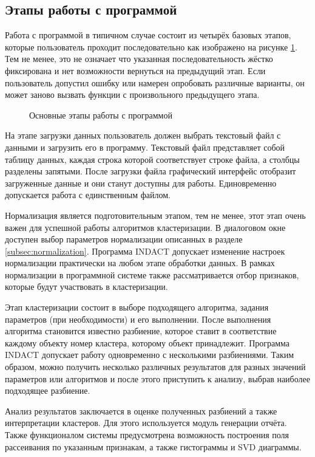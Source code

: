 \documentclass[12pt]{diploma}
\begin{document}
	\subsection{Этапы работы с программой}
	
	Работа с программой в типичном случае состоит из четырёх базовых этапов, которые пользователь проходит последовательно  как изображено на рисунке \ref{fig:stages}. Тем не менее, это не означает что указанная последовательность жёстко фиксирована и нет возможности вернуться на предыдущий этап. Если пользователь допустил ошибку или намерен опробовать различные варианты, он может заново вызвать функции с произвольного предыдущего этапа.
	\begin{figure}[h!]
		\centering		
		
		\caption{Основные этапы работы с программой}
		\label{fig:stages}
	\end{figure}
	
	На этапе загрузки данных пользователь должен выбрать текстовый файл с данными и загрузить его в программу. Текстовый файл представляет собой таблицу данных, каждая строка которой соответствует строке файла, а столбцы разделены запятыми. После загрузки файла графический интерфейс отобразит загруженные данные и они станут доступны для работы. Единовременно допускается работа с единственным файлом.
	
	Нормализация является подготовительным этапом, тем не менее, этот этап очень важен для успешной работы алгоритмов кластеризации. В диалоговом окне доступен выбор параметров нормализации описанных в разделе \ref{subsec:normalization}. Программа INDACT допускает изменение настроек нормализации практически на любом этапе обработки данных. В рамках нормализации в программной системе также рассматривается отбор признаков, которые будут участвовать в кластеризации.
	
	Этап кластеризации состоит в выборе подходящего алгоритма, задания параметров (при необходимости) и его выполнении. После выполнения алгоритма становится известно разбиение, которое ставит в соответствие каждому объекту номер кластера, которому объект принадлежит. Программа INDACT допускает работу одновременно с несколькими разбиениями. Таким образом, можно получить несколько различных результатов для разных значений параметров или алгоритмов и после этого приступить к анализу, выбрав наиболее подходящее разбиение. 
	
	Анализ результатов заключается в оценке полученных разбиений а также интерпретации кластеров. Для этого используется модуль генерации отчёта. Также функционалом системы предусмотрена возможность построения поля рассеивания по указанным признакам, а также гистограммы и SVD диаграммы.
	
\end{document}

